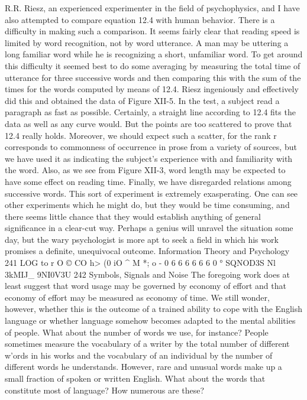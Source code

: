 {{{{{{{{{{{{R.R. Riesz, an experienced experimenter in the field of
psychophysics, and I have also attempted to compare equation
12.4 with human behavior.
There is a difficulty in making such a comparison. It seems
fairly clear that reading speed is limited by word recognition, not
by word utterance. A man may be uttering a long familiar word
while he is recognizing a short, unfamiliar word. To get around
this difficulty it seemed best to do some averaging by measuring
the total time of utterance for three successive words and then
comparing this with the sum of the times for the words computed
by means of 12.4.
Riesz ingeniously and effectively did this and obtained the data
of Figure XII-5. In the test, a subject read a paragraph as fast as
possible. Certainly, a straight line according to 12.4 fits the data
as well as any curve would. But the points are too scattered to prove
that 12.4 really holds.
Moreover, we should expect such a scatter, for the rank r corresponds
to commonness of occurrence in prose from a variety of
sources, but we have used it as indicating the subject’s experience
with and familiarity with the word. Also, as we see from Figure
XII-3, word length may be expected to have some effect on reading
time. Finally, we have disregarded relations among successive
words.
This sort of experiment is extremely exasperating. One can see
other experiments which he might do, but they would be time
consuming, and there seems little chance that they would establish
anything of general significance in a clear-cut way. Perhaps a
genius will unravel the situation some day, but the wary psychologist
is more apt to seek a field in which his work promises a
definite, unequivocal outcome.
Information Theory and Psychology 241
LOG to r
O © CO h> (0 iO ^ M *; o
- 0 6 6 6 6 6 6 0 °
SQNOD3S Nl 3kMIJ_ 9NI0V3U
242
Symbols, Signals and Noise
The foregoing work does at least suggest that word usage may
be governed by economy of effort and that economy of effort may
be measured as economy of time. We still wonder, however,
whether this is the outcome of a trained ability to cope with the
English language or whether language somehow becomes adapted
to the mental abilities of people. What about the number of words
we use, for instance?
People sometimes measure the vocabulary of a writer by the total
number of different w'ords in his works and the vocabulary of an
individual by the number of different words he understands. However,
rare and unusual words make up a small fraction of spoken
or written English. What about the words that constitute most of
language? How numerous are these?
}}}}}}}}}}}}
